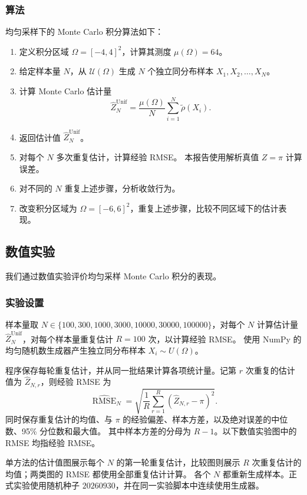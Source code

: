 \documentclass[12pt,a4paper]{ctexart}
\newcommand{\rhoT}{\widetilde{\rho}}
\begin{document}
\subsubsection{算法}

均匀采样下的 Monte Carlo 积分算法如下：
\begin{enumerate}
  \item 定义积分区域 $\Omega=[-4,4]^2$，计算其测度 $\mu(\Omega)=64$。
  \item 给定样本量 $N$，从 $\mathcal U(\Omega)$ 生成 $N$ 个独立同分布样本
    $X_1,X_2,\ldots,X_N$。
  \item 计算 Monte Carlo 估计量
    \[\widehat Z_N^{\mathrm{Unif}}=\frac{\mu(\Omega)}{N}\sum_{i=1}^N\rhoT(X_i).\]
  \item 返回估计值 $\widehat Z_N^{\mathrm{Unif}}$。
  \item 对每个 $N$ 多次重复估计，计算经验 RMSE。
    本报告使用解析真值 $Z=\pi$ 计算误差。
  \item 对不同的 $N$ 重复上述步骤，分析收敛行为。
  \item 改变积分区域为 $\Omega=[-6,6]^2$，重复上述步骤，比较不同区域下的估计表现。
\end{enumerate}

\subsection{数值实验}

我们通过数值实验评价均匀采样 Monte Carlo 积分的表现。

\subsubsection{实验设置}\label{sec:uniform-setup}

样本量取 $N\in\{100,300,1000,3000,10000,30000,100000\}$，对每个 $N$ 计算估计量 $\widehat Z_N^{\mathrm{Unif}}$，对每个样本量重复估计 $R=100$ 次，以计算经验 RMSE。
使用 NumPy 的均匀随机数生成器产生独立同分布样本 $X_i\sim U(\Omega)$。

程序保存每轮重复估计，并从同一批结果计算各项统计量。记第 $r$ 次重复的估计值为 $\widehat Z_{N,r}$，则经验 RMSE 为
\[
\widehat{\operatorname{RMSE}}_N
=\sqrt{\frac1R\sum_{r=1}^R(\widehat Z_{N,r}-\pi)^2}.
\]
同时保存重复估计的均值、与 $\pi$ 的经验偏差、样本方差，以及绝对误差的中位数、95\% 分位数和最大值。
其中样本方差的分母为 $R-1$。以下数值实验图中的 RMSE 均指经验 RMSE。

单方法的估计值图展示每个 $N$ 的第一轮重复估计，比较图则展示 $R$ 次重复估计的均值；两类图的 RMSE 都使用全部重复估计计算。
各个 $N$ 都重新生成样本。正式实验使用随机种子 $20260930$，并在同一实验脚本中连续使用生成器。
\end{document}
